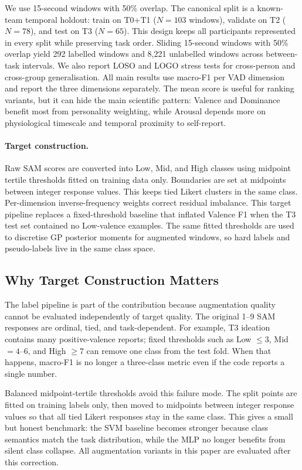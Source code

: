 \documentclass[sigconf,review,anonymous]{acmart}
\begin{document}
We use 15-second windows with 50\% overlap.
The canonical split is a known-team temporal holdout:
train on T0+T1 ($N=103$ windows), validate on T2 ($N=78$), and test on T3
($N=65$).
This design keeps all participants represented in every split while preserving
task order.
Sliding 15-second windows with 50\% overlap yield 292 labelled windows and
8{,}221 unlabelled windows across between-task intervals.
We also report LOSO and LOGO stress tests for cross-person and cross-group
generalisation.
All main results use macro-F1 per VAD dimension and report the three
dimensions separately.
The mean score is useful for ranking variants, but it can hide the main
scientific pattern: Valence and Dominance benefit most from personality
weighting, while Arousal depends more on physiological timescale and temporal
proximity to self-report.

\paragraph{Target construction.}
Raw SAM scores are converted into Low, Mid, and High classes using midpoint
tertile thresholds fitted on training data only.
Boundaries are set at midpoints between integer response values.
This keeps tied Likert clusters in the same class.
Per-dimension inverse-frequency weights correct residual imbalance.
This target pipeline replaces a fixed-threshold baseline that inflated
Valence F1 when the T3 test set contained no Low-valence examples.
The same fitted thresholds are used to discretise GP posterior moments for
augmented windows, so hard labels and pseudo-labels live in the same class
space.

\subsection{Why Target Construction Matters}
\label{sec:target_construction}

The label pipeline is part of the contribution because augmentation quality
cannot be evaluated independently of target quality.
The original 1--9 SAM responses are ordinal, tied, and task-dependent.
For example, T3 ideation contains many positive-valence reports; fixed
thresholds such as Low $\leq 3$, Mid $=4$--$6$, and High $\geq 7$ can remove
one class from the test fold.
When that happens, macro-F1 is no longer a three-class metric even if the code
reports a single number.

Balanced midpoint-tertile thresholds avoid this failure mode.
The split points are fitted on training labels only, then moved to midpoints
between integer response values so that all tied Likert responses stay in the
same class.
This gives a small but honest benchmark: the SVM baseline becomes stronger
because class semantics match the task distribution, while the MLP no longer
benefits from silent class collapse.
All augmentation variants in this paper are evaluated after this correction.
\end{document}

